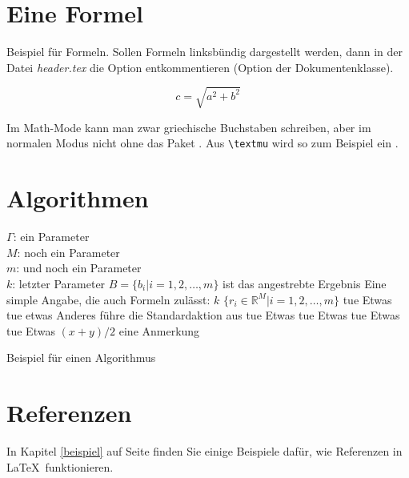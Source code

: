 \section{Eine Formel}

Beispiel für Formeln. Sollen Formeln linksbündig dargestellt werden, dann in der Datei \textit{header.tex} die Option  entkommentieren (Option der Dokumentenklasse).

\begin{equation}
  c = \sqrt{a^2 + b^2}
\end{equation}

Im Math-Mode kann man zwar griechische Buchstaben schreiben, aber im normalen Modus nicht ohne das Paket . Aus \verb$\textmu$ wird so zum Beispiel ein \textmu.

\section{Algorithmen}

\begin{algorithm}[htb]
  \begin{algorithmic}[1]
    \REQUIRE $\Gamma$: ein Parameter \\ $M$: noch ein Parameter  \\  $m$: und noch ein Parameter \\ $k$: letzter Parameter
    \ENSURE $B = \{b_i|i = 1, 2,\dots, m\}$ ist das angestrebte Ergebnis
    \STATE Eine simple Angabe, die auch Formeln zulässt: $k$ \leftarrow $\{r_i \in \mathbb{R}^M |i = 1, 2,\dots, m\}$
    \STATE tue Etwas
    \STATE tue etwas Anderes
    \ELSE
    \STATE führe die Standardaktion aus
    \ENDIF
    \STATE tue Etwas
    \ENDFOR
    \STATE tue Etwas
    \ENDWHILE
    \REPEAT
    \STATE tue Etwas
    \LOOP
    \STATE tue Etwas
    \ENDLOOP
    \RETURN $(x+y)/2$ \COMMENT eine Anmerkung
  \end{algorithmic}
  \caption{Beispiel für einen Algorithmus}
  \label{alg:example}
\end{algorithm}

\section{Referenzen}
\label{refn}

In Kapitel \ref{beispiel} auf Seite \pageref{refn} finden Sie einige Beispiele dafür, wie Referenzen in \LaTeX~funktionieren.

